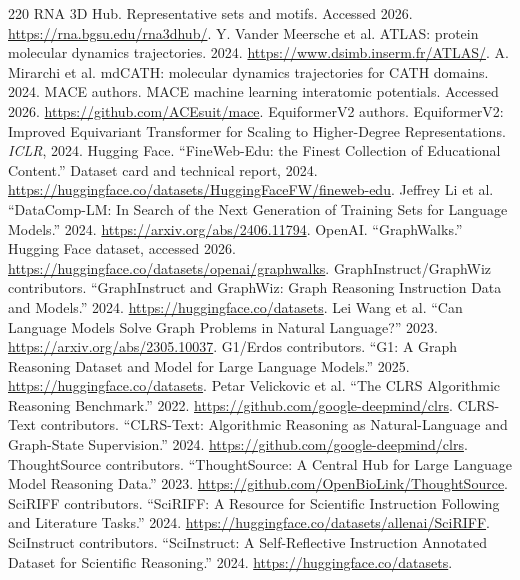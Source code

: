 \documentclass[11pt]{article}
\newcommand{\1}{\mathbf{1}}
\begin{document}
\begin{thebibliography}{220}
 RNA 3D Hub. Representative sets and motifs. Accessed 2026. \url{https://rna.bgsu.edu/rna3dhub/}.
 Y. Vander Meersche et al. ATLAS: protein molecular dynamics trajectories. 2024. \url{https://www.dsimb.inserm.fr/ATLAS/}.
 A. Mirarchi et al. mdCATH: molecular dynamics trajectories for CATH domains. 2024.
 MACE authors. MACE machine learning interatomic potentials. Accessed 2026. \url{https://github.com/ACEsuit/mace}.
 EquiformerV2 authors. EquiformerV2: Improved Equivariant Transformer for Scaling to Higher-Degree Representations. \emph{ICLR}, 2024.
 Hugging Face. ``FineWeb-Edu: the Finest Collection of Educational Content.'' Dataset card and technical report, 2024. \url{https://huggingface.co/datasets/HuggingFaceFW/fineweb-edu}.
 Jeffrey Li et al. ``DataComp-LM: In Search of the Next Generation of Training Sets for Language Models.'' 2024. \url{https://arxiv.org/abs/2406.11794}.
 OpenAI. ``GraphWalks.'' Hugging Face dataset, accessed 2026. \url{https://huggingface.co/datasets/openai/graphwalks}.
 GraphInstruct/GraphWiz contributors. ``GraphInstruct and GraphWiz: Graph Reasoning Instruction Data and Models.'' 2024. \url{https://huggingface.co/datasets}.
 Lei Wang et al. ``Can Language Models Solve Graph Problems in Natural Language?'' 2023. \url{https://arxiv.org/abs/2305.10037}.
 G1/Erdos contributors. ``G1: A Graph Reasoning Dataset and Model for Large Language Models.'' 2025. \url{https://huggingface.co/datasets}.
 Petar Velickovic et al. ``The CLRS Algorithmic Reasoning Benchmark.'' 2022. \url{https://github.com/google-deepmind/clrs}.
 CLRS-Text contributors. ``CLRS-Text: Algorithmic Reasoning as Natural-Language and Graph-State Supervision.'' 2024. \url{https://github.com/google-deepmind/clrs}.
 ThoughtSource contributors. ``ThoughtSource: A Central Hub for Large Language Model Reasoning Data.'' 2023. \url{https://github.com/OpenBioLink/ThoughtSource}.
 SciRIFF contributors. ``SciRIFF: A Resource for Scientific Instruction Following and Literature Tasks.'' 2024. \url{https://huggingface.co/datasets/allenai/SciRIFF}.
 SciInstruct contributors. ``SciInstruct: A Self-Reflective Instruction Annotated Dataset for Scientific Reasoning.'' 2024. \url{https://huggingface.co/datasets}.

\end{thebibliography}
\end{document}
